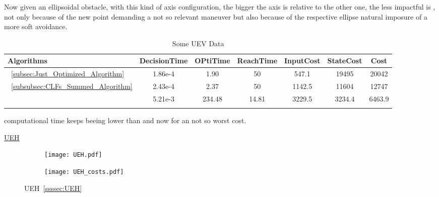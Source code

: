Now given an ellipsoidal obstacle, with this kind of axis configuration, the bigger the axis is relative to the other one, the less impactful is , not only because of the new point demanding a not so relevant maneuver but also because of the respective ellipse  natural imposure of a more soft avoidance. 


  \bgroup
 \begin{xltabular}{\textwidth}{|l|cccccc|}
   \toprule
   Algorithms   & DecisionTime & OPtiTime & ReachTime  & InputCost   & StateCost & Cost           \\
   \midrule
    ~\ref{subsec:Just_Optimized_Algorithm}           & 1.86e-4 & 1.90 & 50 & 547.1 & 19495 & 20042 \\
    ~\ref{subsubsec:CLFs_Summed_Algorithm}        & 2.43e-4 & 2.37 & 50 & 1142.5 & 11604 & 12747 \\
                                                      & 5.21e-3 & 234.48  & 14.81  & 3229.5  & 3234.4 & 6463.9 \\
    \midrule
    \caption{Some UEV Data}
    \label{tab:Some_UEV_Data}\\
   \end{xltabular}
 \egroup


  computational time keeps beeing lower than  and now for an not so worst cost.


  \newpage %


\underline{UEH}
\label{ssssec:UEH_experiments} %

 \begin{figure}[htbp]
  \begin{subfigure}{0.5\textwidth}
    \centering
    \texttt{[image: UEH.pdf]}
  \label{fig:UEH_CostEvol}
  \end{subfigure}
  \begin{subfigure}{0.6\textwidth}
    \centering
    \texttt{[image: UEH\_costs.pdf]}
  \label{fig:UEH_trajectory}
  \end{subfigure}
  \caption{UEH~\ref{ssssec:UEH}}
\label{fig:UEHTrajectory_and_CostEvol}
\end{figure}


